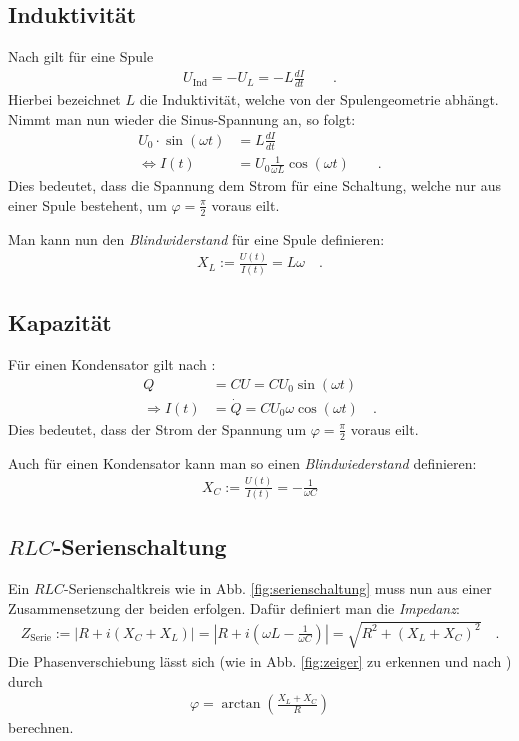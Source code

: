 \documentclass[12pt,a4paper,titlepage,headinclude,bibtotoc]{scrartcl}
\begin{document}
\subsection{Induktivität}
Nach \cite[S. 313]{griffith} gilt für eine Spule
\begin{align}
U_\text{Ind}=-U_L=-L\frac{dI}{dt}\qquad .
\end{align}
Hierbei bezeichnet $L$ die Induktivität, welche von der Spulengeometrie abhängt.
Nimmt man nun wieder die Sinus-Spannung an, so folgt:
\begin{align*}
U_0\cdot\sin(\omega t)&=L\frac{dI}{dt}\\
\Leftrightarrow I(t)&=U_0\frac{1}{\omega L}\cos(\omega t)\qquad .
\end{align*}
Dies bedeutet, dass die Spannung dem Strom für eine Schaltung, welche nur aus einer Spule bestehent, um $\varphi=\frac{\pi}{2}$ voraus eilt.

Man kann nun den \emph{Blindwiderstand} für eine Spule definieren:
\begin{align}
X_L:=\frac{U(t)}{I(t)}=L\omega\quad .
\end{align}



\subsection{Kapazität}
Für einen Kondensator gilt nach \cite[S. 822]{giancoli}:
\begin{align*}
Q&=CU=CU_0\sin(\omega t)\\
\Rightarrow I(t)&=\dot Q=CU_0\omega\cos(\omega t)\quad .
\end{align*}
Dies bedeutet, dass der Strom der Spannung um $\varphi=\frac{\pi}{2}$ voraus eilt.

Auch für einen Kondensator kann man so einen \emph{Blindwiederstand} definieren:
\begin{align}
X_C:=\frac{U(t)}{I(t)}=-\frac{1}{\omega C}
\end{align}

\subsection{$RLC$-Serienschaltung}
\label{sec:RLC}
Ein $RLC$-Serienschaltkreis wie in Abb. \ref{fig:serienschaltung} muss nun aus einer Zusammensetzung der beiden erfolgen.
Dafür definiert man die \emph{Impedanz}:
\begin{align}
Z_\text{Serie}:=\left|R+i(X_C+X_L)\right|=\left|R+i\left( \omega L-\frac{1}{\omega C} \right)\right|=\sqrt{R^2+(X_L+X_C)^2}\quad .
\end{align}
Die Phasenverschiebung lässt sich (wie in Abb. \ref{fig:zeiger} zu erkennen und nach \cite[S. 1042]{giancoli}) durch
\begin{align}
\varphi=\arctan\left( \frac{X_L+X_C}{R} \right)
\end{align}
berechnen.
\end{document}
